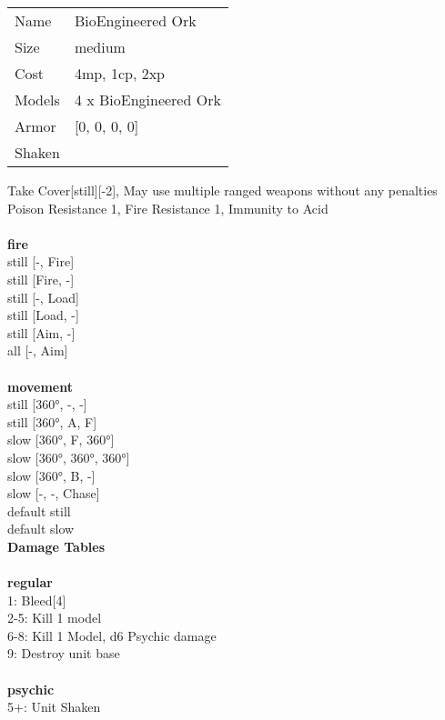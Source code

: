 \begin{tabular}{ll}
  Name & BioEngineered Ork \\
  Size & medium\\
  Cost & 4mp, 1cp, 2xp\\
  Models & 4 x BioEngineered Ork\\
  Armor & [0, 0, 0, 0]\\
  Shaken & \\
\end{tabular}

\noindent Take Cover[still][-2], May use multiple ranged weapons without any penalties\\ 
Poison Resistance 1, Fire Resistance 1, Immunity to Acid\\ 


\ \\ {\bf fire } \\
still [-, Fire] \\
still [Fire, -] \\
still [-, Load] \\
still [Load, -] \\
still [Aim, -] \\
all [-, Aim] \\
\ \\ {\bf movement } \\
still [360°, -, -] \\
still [360°, A, F] \\
slow [360°, F, 360°] \\
slow [360°, 360°, 360°] \\
slow [360°, B, -] \\
slow [-, -, Chase] \\
default still \\
default slow \\


{\bf Damage Tables} \\
\ \\ {\bf regular } \\
1: Bleed[4] \\
2-5: Kill 1 model \\
6-8: Kill 1 Model, d6 Psychic damage \\
9: Destroy unit base \\
\ \\ {\bf psychic } \\
5+: Unit Shaken \\


